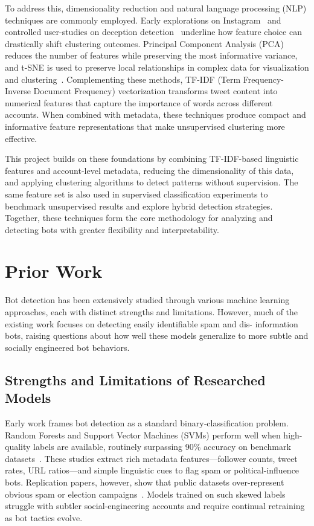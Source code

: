 \documentclass[10pt,twocolumn]{article}
\begin{document}
To address this, dimensionality reduction and natural language processing (NLP) techniques are commonly employed. Early explorations on Instagram~\cite{Akyon2019instagram} and controlled user-studies on deception detection~\cite{Kenny2022duped} underline how feature choice can drastically shift clustering outcomes. Principal Component Analysis (PCA) reduces the number of features while preserving the most informative variance, and t-SNE is used to preserve local relationships in complex data for visualization and clustering~\cite{van2008visualizing}. Complementing these methods, TF-IDF (Term Frequency-Inverse Document Frequency) vectorization transforms tweet content into numerical features that capture the importance of words across different accounts. When combined with metadata, these techniques produce compact and informative feature representations that make unsupervised clustering more effective.

This project builds on these foundations by combining TF-IDF-based linguistic features and account-level metadata, reducing the dimensionality of this data, and applying clustering algorithms to detect patterns without supervision. The same feature set is also used in supervised classification experiments to benchmark unsupervised results and explore hybrid detection strategies. Together, these techniques form the core methodology for analyzing and detecting bots with greater flexibility and interpretability.


\section{Prior Work}
Bot detection has been extensively studied through
various machine learning approaches, each with distinct
strengths and limitations. However, much of the existing
work focuses on detecting easily identifiable spam and dis-
information bots, raising questions about how well these
models generalize to more subtle and socially engineered
bot behaviors.

\subsection{Strengths and Limitations of Researched Models} 
Early work frames bot detection as a standard binary‐classification problem. Random Forests and Support Vector Machines (SVMs) perform well when high-quality labels are available, routinely surpassing 90\% accuracy on benchmark datasets~\cite{Heidari2021empirical,varol2017online,Hayawi2023social}.  
These studies extract rich metadata features—follower counts, tweet rates, URL ratios—and simple linguistic cues to flag spam or political-influence bots. Replication papers, however, show that public datasets over-represent obvious spam or election campaigns~\cite{cresci2017paradigm,Orabi2020detection}.  Models trained on such skewed labels struggle with subtler social-engineering accounts and require continual retraining as bot tactics evolve.
\end{document}
